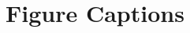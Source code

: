 \documentclass[preprint,5p,authoryear]{elsarticle}
\begin{document}
        








\pagebreak







\pagebreak

\section*{Figure Captions}
\end{document}
